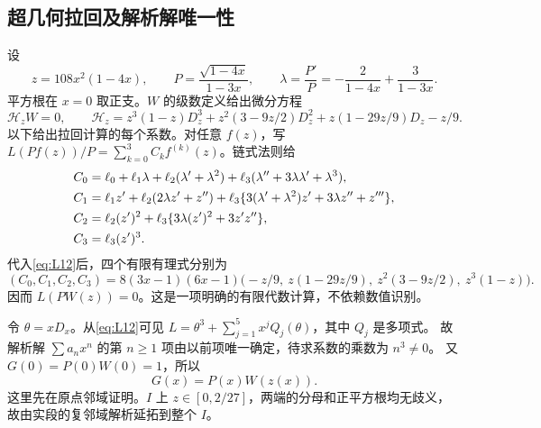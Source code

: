 \documentclass[11pt,a4paper]{article}
\numberwithin{equation}{section}
\theoremstyle{remark}\newtheorem{remark}[theorem]{说明}
\begin{document}
\subsection{超几何拉回及解析解唯一性}
设
\[
 z=108x^2(1-4x),\qquad P=\frac{\sqrt{1-4x}}{1-3x},\qquad
 \lambda=\frac{P'}P=-\frac2{1-4x}+\frac3{1-3x}.
\]
平方根在 $x=0$ 取正支。$W$ 的级数定义给出微分方程
\begin{equation}\label{eq:H3F2}
 \mathcal H_zW=0,\qquad
 \mathcal H_z=z^3(1-z)D_z^3+z^2(3-9z/2)D_z^2
                    +z(1-29z/9)D_z-z/9.
\end{equation}
以下给出拉回计算的每个系数。对任意 $f(z)$，写
$L(Pf(z))/P=\sum_{k=0}^3 C_k f^{(k)}(z)$。链式法则给
\begin{align}
 C_0={}&\ell_0+\ell_1\lambda+\ell_2(\lambda'+\lambda^2)
              +\ell_3(\lambda''+3\lambda\lambda'+\lambda^3),\notag\\
 C_1={}&\ell_1z'+\ell_2(2\lambda z'+z'')
     +\ell_3\{3(\lambda'+\lambda^2)z'+3\lambda z''+z'''\},\notag\\
 C_2={}&\ell_2(z')^2+\ell_3\{3\lambda(z')^2+3z'z''\},\label{eq:pull12coeff}\\
 C_3={}&\ell_3(z')^3.\notag
\end{align}
代入\eqref{eq:L12}后，四个有限有理式分别为
\begin{equation}\label{eq:pull12table}
 (C_0,C_1,C_2,C_3)=8(3x-1)(6x-1)
 \bigl(-z/9,\ z(1-29z/9),\ z^2(3-9z/2),\ z^3(1-z)\bigr).
\end{equation}
因而 $L(PW(z))=0$。这是一项明确的有限代数计算，不依赖数值识别。

令 $\theta=xD_x$。从\eqref{eq:L12}可见
$L=\theta^3+\sum_{j=1}^{5}x^jQ_j(\theta)$，其中 $Q_j$ 是多项式。
故解析解 $\sum a_nx^n$ 的第 $n\ge1$ 项由以前项唯一确定，待求系数的乘数为 $n^3\ne0$。
又 $G(0)=P(0)W(0)=1$，所以
\begin{equation}\label{eq:G12}
 \boxed{G(x)=P(x)W(z(x)).}
\end{equation}
这里先在原点邻域证明。$I$ 上 $z\in[0,2/27]$，两端的分母和正平方根均无歧义，
故由实段的复邻域解析延拓到整个 $I$。
\end{document}
